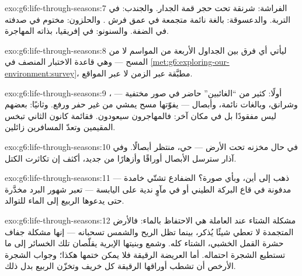 \begin{solution}{exo:g6:life-through-seasons:7}
الفراشة: شرنقة تحت حجر قمة الجدار. والجندب:  في التربة.
والدعسوقة: بالغة نائمة متجمعة في عمق فرش . والحلزون: مختوم
في صدفته في الضفة. والسنونو: في إفريقيا، بذاته المهاجرة.
\end{solution}

\begin{solution}{exo:g6:life-through-seasons:8}
ليأتي أي فرق بين الجداول الأربعة من المواسم لا من المسح --- وهي
قاعدة الاختبار المنصف في
\cref{met:g6:exploring-our-environment:survey}، مطبَّقة عبر الزمن
لا عبر المواقع.
\end{solution}

\begin{solution}{exo:g6:life-through-seasons:9}
أولًا: كثير من ``الغائبين'' حاضر في صور مختفية --- ، وشرانق،
وبالغات نائمة، وأبصال --- يفوّتها مسح يمشي من غير حفر ورفع.
وثانيًا: بعضهم ليس مفقودًا بل في مكان آخر: فالمهاجرون سيعودون.
فقائمة كانون الثاني تبخس المقيمين وتعدّ المسافرين زائلين.
\end{solution}

\begin{solution}{exo:g6:life-through-seasons:10}
 في حال مخزنه تحت الأرض --- حي، منتظر أبصالًا. وفي آذار
سترسل الأبصال أوراقًا وأزهارًا من جديد، أكثف إن تكاثرت الكتل.
\end{solution}

\begin{solution}{exo:g6:life-through-seasons:11}
ذهب إلى أين، وبأي صورة؟ الضفادع تشتّي خامدة --- مدفونة في قاع
البركة الطيني أو في مآوٍ ندية على اليابسة --- تعبر شهور البرد
مخدَّرة حتى يدعوها الربيع إلى الماء للتوالد.
\end{solution}

\begin{solution}{exo:g6:life-through-seasons:12}
مشكلة الشتاء عند  العاملة هي الاحتفاظ بالماء: فالأرض
المتجمدة لا تعطي  شيئًا يُذكر، بينما تظل الريح والشمس
تسحبانه --- إنها مشكلة جفاف حشرة القمل الخشبي، الشتاء كله. وشمع
  وبنيتها الإبرية يقلّصان تلك الخسائر إلى ما
تستطيع الشجرة احتماله. أما  العريضة الرقيقة فلا يمكن ختمها
هكذا؛ وجواب الشجرة  الأرخص أن تشطب أوراقها الرقيقة كل خريف
وتخزّن الربيع  بدل ذلك.
\end{solution}

